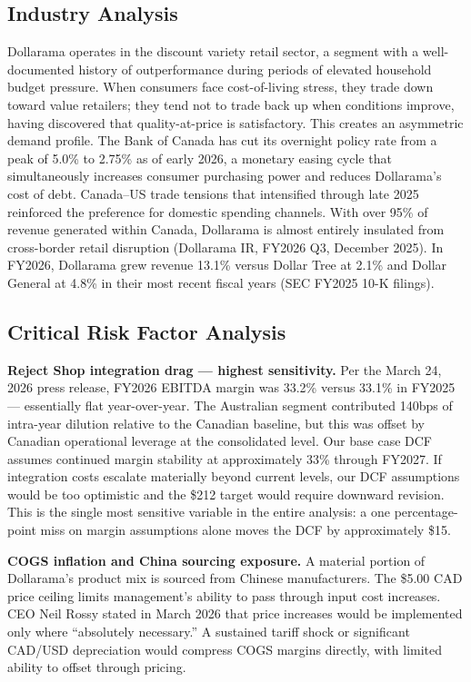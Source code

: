 \documentclass[11pt]{article}
\begin{document}
\subsection{Industry Analysis}
Dollarama operates in the discount variety retail sector, a segment with a well-documented history of outperformance during periods of elevated household budget pressure. When consumers face cost-of-living stress, they trade down toward value retailers; they tend not to trade back up when conditions improve, having discovered that quality-at-price is satisfactory. This creates an asymmetric demand profile. The Bank of Canada has cut its overnight policy rate from a peak of 5.0\% to 2.75\% as of early 2026, a monetary easing cycle that simultaneously increases consumer purchasing power and reduces Dollarama's cost of debt. Canada--US trade tensions that intensified through late 2025 reinforced the preference for domestic spending channels. With over 95\% of revenue generated within Canada, Dollarama is almost entirely insulated from cross-border retail disruption (Dollarama IR, FY2026 Q3, December 2025). In FY2026, Dollarama grew revenue 13.1\% versus Dollar Tree at 2.1\% and Dollar General at 4.8\% in their most recent fiscal years (SEC FY2025 10-K filings).

\subsection{Critical Risk Factor Analysis}
\textbf{Reject Shop integration drag --- highest sensitivity.} Per the March 24, 2026 press release, FY2026 EBITDA margin was 33.2\% versus 33.1\% in FY2025 --- essentially flat year-over-year. The Australian segment contributed 140bps of intra-year dilution relative to the Canadian baseline, but this was offset by Canadian operational leverage at the consolidated level. Our base case DCF assumes continued margin stability at approximately 33\% through FY2027. If integration costs escalate materially beyond current levels, our DCF assumptions would be too optimistic and the \$212 target would require downward revision. This is the single most sensitive variable in the entire analysis: a one percentage-point miss on margin assumptions alone moves the DCF by approximately \$15.

\textbf{COGS inflation and China sourcing exposure.} A material portion of Dollarama's product mix is sourced from Chinese manufacturers. The \$5.00 CAD price ceiling limits management's ability to pass through input cost increases. CEO Neil Rossy stated in March 2026 that price increases would be implemented only where ``absolutely necessary.'' A sustained tariff shock or significant CAD/USD depreciation would compress COGS margins directly, with limited ability to offset through pricing.
\end{document}

